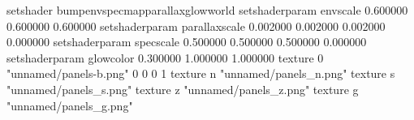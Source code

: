setshader bumpenvspecmapparallaxglowworld
setshaderparam envscale 0.600000 0.600000 0.600000
setshaderparam parallaxscale 0.002000 0.002000 0.002000 0.000000
setshaderparam specscale 0.500000 0.500000 0.500000 0.000000
setshaderparam glowcolor 0.300000 1.000000 1.000000
texture 0 "unnamed/panels-b.png" 0 0 0 1
texture n "unnamed/panels_n.png"
texture s "unnamed/panels_s.png"
texture z "unnamed/panels_z.png"
texture g "unnamed/panels_g.png"